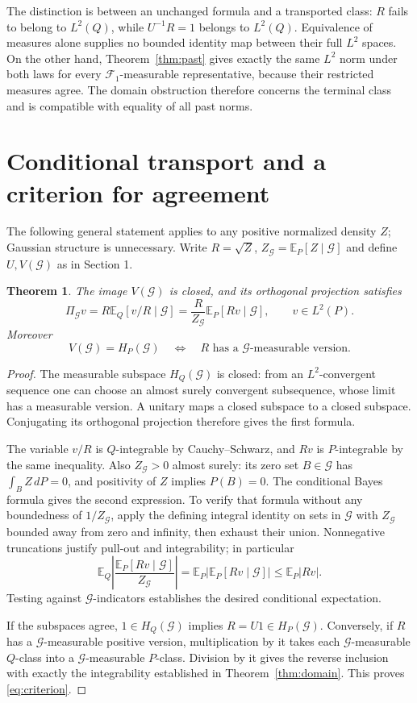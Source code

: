 \documentclass[11pt]{article}
\newtheorem{theorem}{Theorem}[section]
\theoremstyle{remark}\newtheorem{remark}[theorem]{Remark}
\newcommand{\E}{\mathbb E}
\newcommand{\G}{\mathcal G}
\newcommand{\F}{\mathcal F}
\begin{document}
The distinction is between an unchanged formula and a transported class: $R$ fails to belong to $L^2(Q)$, while $U^{-1}R=1$ belongs to $L^2(Q)$. Equivalence of measures alone supplies no bounded identity map between their full $L^2$ spaces. On the other hand, Theorem~\ref{thm:past} gives exactly the same $L^2$ norm under both laws for every $\F_1$-measurable representative, because their restricted measures agree. The domain obstruction therefore concerns the terminal class and is compatible with equality of all past norms.

\section{Conditional transport and a criterion for agreement}
The following general statement applies to any positive normalized density $Z$; Gaussian structure is unnecessary. Write $R=\sqrt Z$, $Z_\G=\E_P[Z\mid\G]$ and define $U,V(\G)$ as in Section 1.

\begin{theorem}\label{thm:projection}
The image $V(\G)$ is closed, and its orthogonal projection satisfies
\begin{equation}\label{eq:projection}
 \Pi_\G v=R\E_Q[v/R\mid\G]
 =\frac{R}{Z_\G}\E_P[Rv\mid\G],\qquad v\in L^2(P).
\end{equation}
Moreover
\begin{equation}\label{eq:criterion}
 V(\G)=H_P(\G)\quad\Longleftrightarrow\quad
 R\text{ has a }\G\text{-measurable version}.
\end{equation}
\end{theorem}
\begin{proof}
The measurable subspace $H_Q(\G)$ is closed: from an $L^2$-convergent sequence one can choose an almost surely convergent subsequence, whose limit has a measurable version. A unitary maps a closed subspace to a closed subspace. Conjugating its orthogonal projection therefore gives the first formula.

The variable $v/R$ is $Q$-integrable by Cauchy--Schwarz, and $Rv$ is $P$-integrable by the same inequality. Also $Z_\G>0$ almost surely: its zero set $B\in\G$ has $\int_B Z\,dP=0$, and positivity of $Z$ implies $P(B)=0$. The conditional Bayes formula gives the second expression. To verify that formula without any boundedness of $1/Z_\G$, apply the defining integral identity on sets in $\G$ with $Z_\G$ bounded away from zero and infinity, then exhaust their union. Nonnegative truncations justify pull-out and integrability; in particular
\[
 \E_Q\left|\frac{\E_P[Rv\mid\G]}{Z_\G}\right|
 =\E_P\left|\E_P[Rv\mid\G]\right|\le\E_P|Rv|.
\]
Testing against $\G$-indicators establishes the desired conditional expectation.

If the subspaces agree, $1\in H_Q(\G)$ implies $R=U1\in H_P(\G)$. Conversely, if $R$ has a $\G$-measurable positive version, multiplication by it takes each $\G$-measurable $Q$-class into a $\G$-measurable $P$-class. Division by it gives the reverse inclusion with exactly the integrability established in Theorem~\ref{thm:domain}. This proves \eqref{eq:criterion}.
\end{proof}
\end{document}
